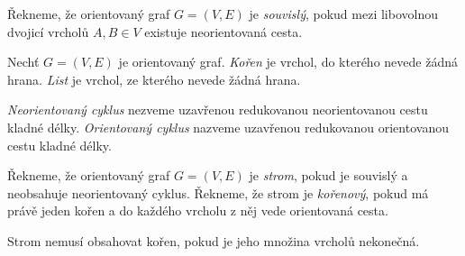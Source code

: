

\begin{definice}
    Řekneme, že orientovaný graf $G=(V,E)$ je \emph{souvislý}, pokud mezi libovolnou dvojicí vrcholů $A, B \in V$ existuje neorientovaná cesta.
\end{definice}

\begin{definice}
    Nechť $G = (V, E)$ je orientovaný graf. \emph{Kořen} je vrchol, do kterého nevede žádná hrana. \emph{List} je vrchol, ze kterého nevede žádná hrana.
\end{definice}

\begin{definice}[Cyklus]
    \emph{Neorientovaný cyklus} nezveme uzavřenou redukovanou neorientovanou cestu kladné délky.
    \emph{Orientovaný cyklus} nazveme uzavřenou redukovanou orientovanou cestu kladné délky.
\end{definice}

\begin{definice}[Strom]
    Řekneme, že orientovaný graf $G=(V,E)$ je \emph{strom}, pokud je souvislý a neobsahuje neorientovaný cyklus. Řekneme, že strom je \emph{kořenový}, pokud má právě jeden kořen a do každého vrcholu z něj vede orientovaná cesta. 
\end{definice}
\begin{pozn}
    Strom nemusí obsahovat kořen, pokud je jeho množina vrcholů nekonečná. 
\end{pozn}


